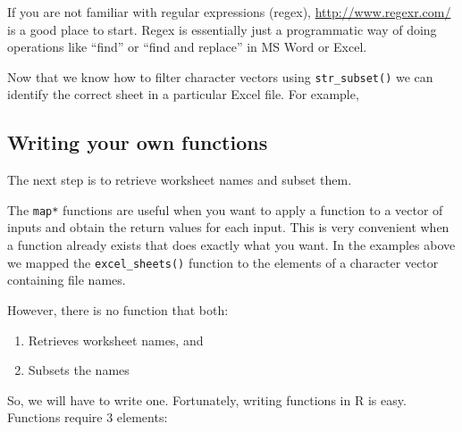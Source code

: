 \documentclass[
]{book}
\newenvironment{Shaded}{\begin{snugshade}}{\end{snugshade}}
\newcommand{\CommentTok}[1]{\textcolor[rgb]{0.56,0.35,0.01}{\textit{#1}}}
\newcommand{\DataTypeTok}[1]{\textcolor[rgb]{0.13,0.29,0.53}{#1}}
\newcommand{\DecValTok}[1]{\textcolor[rgb]{0.00,0.00,0.81}{#1}}
\newcommand{\KeywordTok}[1]{\textcolor[rgb]{0.13,0.29,0.53}{\textbf{#1}}}
\newcommand{\NormalTok}[1]{#1}
\newcommand{\OperatorTok}[1]{\textcolor[rgb]{0.81,0.36,0.00}{\textbf{#1}}}
\newcommand{\StringTok}[1]{\textcolor[rgb]{0.31,0.60,0.02}{#1}}
\providecommand{\tightlist}{%
  \setlength{\itemsep}{0pt}\setlength{\parskip}{0pt}}
\begin{document}
If you are not familiar with regular expressions (regex),
\url{http://www.regexr.com/} is a good place to start. Regex is essentially
just a programmatic way of doing operations like ``find'' or ``find and replace''
in MS Word or Excel.

Now that we know how to filter character vectors using \texttt{str\_subset()} we can
identify the correct sheet in a particular Excel file. For example,

\begin{Shaded}
\end{Shaded}

\hypertarget{writing-your-own-functions}{%
\subsection{Writing your own functions}\label{writing-your-own-functions}}

The next step is to retrieve worksheet names and subset them.

The \texttt{map*} functions are useful when you want to apply a function to a
vector of inputs and obtain the return values for each input. This
is very convenient when a function already exists that does exactly what you
want. In the examples above we mapped the \texttt{excel\_sheets()} function to
the elements of a character vector containing file names.

However, there is no function that both:

\begin{enumerate}
\def\labelenumi{\arabic{enumi}.}
\tightlist
\item
  Retrieves worksheet names, and
\item
  Subsets the names
\end{enumerate}

So, we will have to write one. Fortunately, writing functions in R is easy.
Functions require 3 elements:
\end{document}
